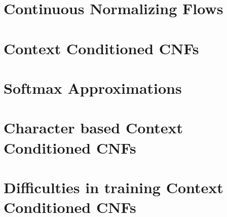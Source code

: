 \section{Continuous Normalizing Flows}

\section{Context Conditioned CNFs}

\section{Softmax Approximations}

\section{Character based Context Conditioned CNFs}

\section{Difficulties in training Context Conditioned CNFs}